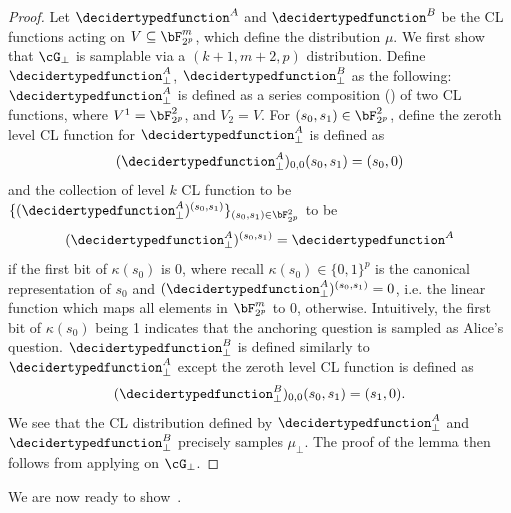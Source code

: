 \begin{proof}
	Let $\decidertypedfunction^{A}$ and $\decidertypedfunction^{B}$ be the CL functions acting on $V \subseteq \bF_{2^p}^m$, which define the distribution $\mu$. We first show that $\cG_{\bot}$ is samplable via a $(k+1,m+2,p)$ distribution. Define $\decidertypedfunction^{A}_{\bot}$, $\decidertypedfunction^{B}_{\bot}$ as the following:
	$\decidertypedfunction^A_{\bot}$ is defined as a series composition () of two CL functions, where $V^1 = \bF_{2^p}^2$, and $V_2 = V$. For $(s_0, s_1) \in \bF_{2^p}^2$, define the zeroth level CL function for $\decidertypedfunction^A_{\bot}$ is defined as
	\begin{equation*}
		(\decidertypedfunction^A_{\bot})_{0,0} (s_0, s_1) = (s_0, 0)
	\end{equation*}
	and the collection of level $k$ CL function to be $\{(\decidertypedfunction^A_{\bot})^{(s_0, s_1)}\}_{(s_0, s_1) \in \bF_{2^p}^2}$ to be
	\begin{equation*}
		(\decidertypedfunction^A_{\bot})^{(s_0, s_1)} = \decidertypedfunction^A
	\end{equation*}
	if the first bit of $\kappa(s_0)$ is 0, where recall $\kappa(s_0) \in \{0,1\}^p$ is the canonical representation of $s_0$ and $(\decidertypedfunction^A_{\bot})^{(s_0, s_1)} = 0$, i.e. the linear function which maps all elements in $\bF^{m}_{2^p}$ to 0, otherwise. Intuitively, the first bit of $\kappa(s_0)$ being 1 indicates that the anchoring question is sampled as Alice's question. $\decidertypedfunction^B_{\bot}$ is defined similarly to $\decidertypedfunction^A_{\bot}$ except the zeroth level CL function is defined as
	\begin{equation*}
		(\decidertypedfunction^B_{\bot})_{0,0} (s_0, s_1) = (s_1, 0). 
	\end{equation*}
	We see that the CL distribution defined by $\decidertypedfunction^A_{\bot}$ and $\decidertypedfunction^B_{\bot}$ precisely samples $\mu_{\bot}$. The proof of the lemma then follows from applying  on $\cG_{\bot}$. 
\end{proof}

We are now ready to show~. 

